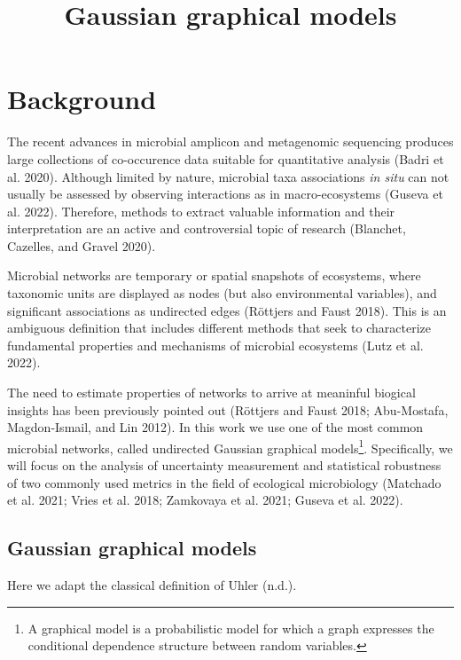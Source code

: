 \documentclass[
]{article}
\title{Gaussian graphical models}
\author{}
\date{\vspace{-2.5em}}
\begin{document}
\maketitle

\hypertarget{background}{%
\section{Background}\label{background}}

The recent advances in microbial amplicon and metagenomic sequencing
produces large collections of co-occurence data suitable for
quantitative analysis (Badri et al. 2020). Although limited by nature,
microbial taxa associations \emph{in situ} can not usually be assessed
by observing interactions as in macro-ecosystems (Guseva et al. 2022).
Therefore, methods to extract valuable information and their
interpretation are an active and controversial topic of research
(Blanchet, Cazelles, and Gravel 2020).

Microbial networks are temporary or spatial snapshots of ecosystems,
where taxonomic units are displayed as nodes (but also environmental
variables), and significant associations as undirected edges (Röttjers
and Faust 2018). This is an ambiguous definition that includes different
methods that seek to characterize fundamental properties and mechanisms
of microbial ecosystems (Lutz et al. 2022).

The need to estimate properties of networks to arrive at meaninful
biogical insights has been previously pointed out (Röttjers and Faust
2018; Abu-Mostafa, Magdon-Ismail, and Lin 2012). In this work we use one
of the most common microbial networks, called undirected Gaussian
graphical models\footnote{A graphical model is a probabilistic model for
  which a graph expresses the conditional dependence structure between
  random variables.}. Specifically, we will focus on the analysis of
uncertainty measurement and statistical robustness of two commonly used
metrics in the field of ecological microbiology (Matchado et al. 2021;
Vries et al. 2018; Zamkovaya et al. 2021; Guseva et al. 2022).

\hypertarget{gaussian-graphical-models}{%
\subsection{Gaussian graphical models}\label{gaussian-graphical-models}}

Here we adapt the classical definition of Uhler (n.d.).
\end{document}
